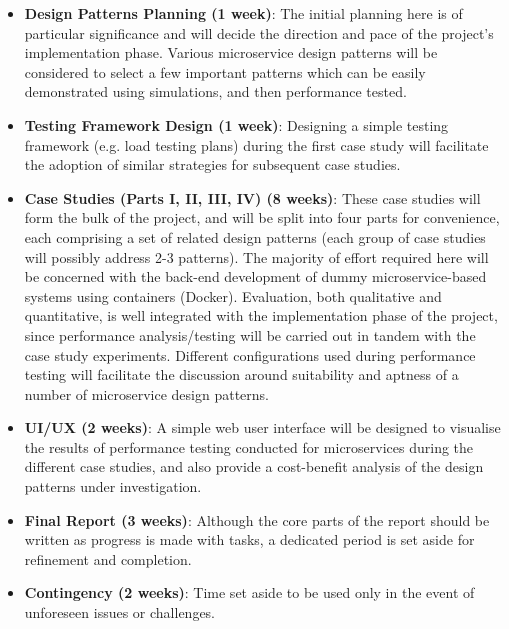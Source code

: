 \begin{itemize}
	\item \textbf{Design Patterns Planning (1 week)}: The initial planning here is of particular significance and will decide the direction and pace of the project's implementation phase. Various microservice design patterns will be considered to select a few important patterns which can be easily demonstrated using simulations, and then performance tested.

	\item \textbf{Testing Framework Design (1 week)}: Designing a simple testing framework (e.g. load testing plans) during the first case study will facilitate the adoption of similar strategies for subsequent case studies. 

	\item \textbf{Case Studies (Parts I, II, III, IV) (8 weeks)}: These case studies will form the bulk of the project, and will be split into four parts for convenience, each comprising a set of related design patterns (each group of case studies will possibly address 2-3 patterns). The majority of effort required here will be concerned with the back-end development of dummy microservice-based systems using containers (Docker). Evaluation, both qualitative and quantitative, is well integrated with the implementation phase of the project, since performance analysis/testing will be carried out in tandem with the case study experiments. Different configurations used during performance testing will facilitate the discussion around suitability and aptness of a number of microservice design patterns.

	\item \textbf{UI/UX (2 weeks)}: A simple web user interface will be designed to visualise the results of performance testing conducted for microservices during the different case studies, and also provide a cost-benefit analysis of the design patterns under investigation.

	\item \textbf{Final Report (3 weeks)}: Although the core parts of the report should be written as progress is made with tasks, a dedicated period is set aside for refinement and completion.

	\item \textbf{Contingency (2 weeks)}: Time set aside to be used only in the event of unforeseen issues or challenges.
\end{itemize}

